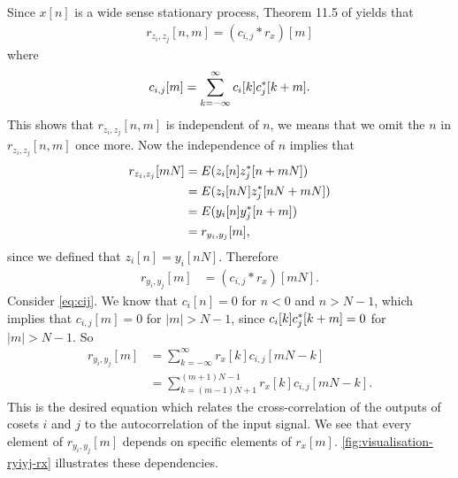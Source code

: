 \documentclass[a4paper, openany, oneside]{memoir}
\begin{document}
Since $x[n]$ is a wide sense stationary process, Theorem 11.5 of \cite{yates2005probability} yields that
\begin{align*}
    r_{z_i,z_j}[n,m] = (c_{i,j} \ast r_{x})[m]
\end{align*}
where
\begin{align} \label{eq:cij}
    c_{i,j}[m] = \sum_{k=-\infty}^{\infty}c_i[k] c^*_j[k+m].
\end{align}
This shows that $r_{z_i,z_j}[n,m]$ is independent of $n$, we means that we omit the $n$ in $r_{z_i,z_j}[n,m]$  once more. Now the independence of $n$ implies that
\begin{align*}
    r_{z_i,z_j}[mN] &= E(z_i[n]z^*_j[n+mN]) \\
    &= E(z_i[nN]z^*_j[nN+mN]) \\
    &= E(y_i[n]y^*_j[n+m]) \\
    &= r_{y_i,y_j}[m],
\end{align*}
since we defined that $z_i[n]=y_i[nN]$. Therefore
\begin{align*}
    r_{y_i,y_j}[m] &= (c_{i,j}\ast r_{x})[mN].
\end{align*}
Consider \cref{eq:cij}. We know that $c_i[n]=0$ for $n < 0$ and $n > N-1$, which implies that $c_{i,j}[m]=0$ for $|m| > N-1$, since $c_i[k]c^*_j[k+m]=0$ for $|m| > N-1$. So
\begin{align} \label{eq:ryiyj-rx}
    r_{y_i,y_j}[m] &= \sum_{k=-\infty}^{\infty}r_{x}[k]c_{i,j}[mN-k] \nonumber \\
    &= \sum_{k=(m-1)N+1}^{(m+1)N-1}r_{x}[k]c_{i,j}[mN-k].
\end{align}
This is the desired equation which relates the cross-correlation of the outputs of cosets $i$ and $j$ to the autocorrelation of the input signal.
We see that every element of $r_{y_i,y_j}[m]$ depends on specific elements of $r_x[m]$. \cref{fig:visualisation-ryiyj-rx} illustrates these dependencies.
\end{document}
